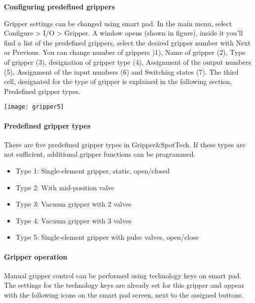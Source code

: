  	\newpage
	\textbf{Configuring predefined grippers}

	\bigskip

	\begin{minipage}{0.5\textwidth}
	Gripper settings can be changed using smart pad. In the main menu, select Configure > I/O > Gripper. A window opens (shown in figure), inside it you’ll find a list of the predefined grippers, select the desired gripper number with Next or Previous. 
	\newline
	You can change number of grippers )1), Name of gripper (2), Type of gripper (3), designation of gripper type (4), Assignment of the output numbers (5), Assignment of the input numbers (6) and Switching states (7). 
	\newline
	The third cell, designated for the type of gripper is explained in the following section, Predefined gripper types.
	\end{minipage} \hfill
	\begin{minipage}{0.6\textwidth}
		\texttt{[image: gripper5]}
	\end{minipage}
 		
 	\paragraph{Predefined gripper types}
 	There are five predefined gripper types in Gripper\&SpotTech. If these types are not sufficient, additional gripper functions can be programmed.
 		\begin{itemize}
 			\item Type 1: Single-element gripper, static, open/closed
 			\item Type 2: With mid-position valve
 			\item Type 3: Vacuum gripper with 2 valves
 			\item Type 4: Vacuum gripper with 3 valves
 			\item Type 5: Single-element gripper with pulse valves, open/close
 		\end{itemize}

 		\paragraph{Gripper operation}
 		Manual gripper control can be performed using technology keys on smart pad. The settings for the technology keys are already set for this gripper and appear with the following icons on the smart pad screen, next to the assigned buttons. 
 		
